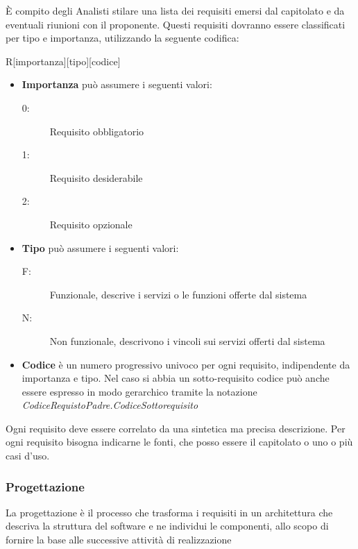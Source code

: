 \documentclass[12pt,a4paper]{article}
\begin{document}
È compito degli Analisti stilare una lista dei requisiti emersi dal capitolato e da eventuali
riunioni con il proponente. Questi requisiti dovranno essere classificati per tipo e
importanza, utilizzando la seguente codifica:
\begin{center}
R[importanza][tipo][codice]
\end{center}
\begin{itemize}
\item \textbf{Importanza} può assumere i seguenti valori:
\begin{description}
\item[0:] Requisito obbligatorio
\item[1:] Requisito desiderabile
\item[2:] Requisito opzionale
\end{description}
\end{itemize}
\begin{itemize}
\item \textbf{Tipo} può assumere i seguenti valori:
\begin{description}
\item[F:] Funzionale, descrive i servizi o le funzioni offerte dal sistema
\item[N:] Non funzionale, descrivono i vincoli sui servizi offerti dal sistema
\end{description}
\end{itemize}
\begin{itemize}
\item \textbf{Codice} è un numero progressivo univoco per ogni requisito, indipendente da importanza e tipo. Nel caso si abbia un sotto-requisito codice può anche essere espresso in modo gerarchico tramite la notazione \textit{CodiceRequistoPadre.CodiceSottorequisito}
\end{itemize}
Ogni requisito deve essere correlato da una sintetica ma precisa descrizione. Per ogni requisito bisogna indicarne le fonti, che posso essere il capitolato o uno o più casi d'uso.

\subsubsection{Progettazione}

La progettazione è il processo che trasforma i requisiti in un architettura che descriva la struttura del software e ne individui le componenti, allo scopo di fornire la base alle successive attività di realizzazione
\end{document}
